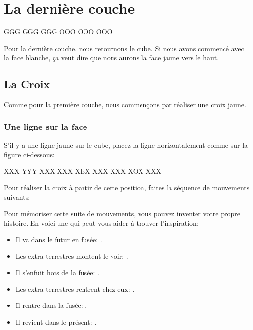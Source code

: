 \chapter{La dernière couche}


{
	\centering
	\RubikFaceRight%
	{G}{G}{G}%
	{G}{G}{G}%
	{G}{G}{G}
	\RubikFaceFront%
	{O}{O}{O}%
	{O}{O}{O}%
	{O}{O}{O}
	\par
}

Pour la dernière couche, nous retournons le cube. Si nous avons commencé avec la face blanche, ça veut dire que nous aurons la face jaune vers le haut. 

\section{La Croix}

Comme pour la première couche, nous commençons par réaliser une croix jaune.

\subsection{Une ligne sur la face}

\begin{samepage}
S’il y a une ligne jaune sur le cube, placez la ligne horizontalement comme sur la figure ci-dessous:

\begin{center}	
	\RubikFaceUp%
	{X}{X}{X}%
	{Y}{Y}{Y}%
	{X}{X}{X}
	\RubikFaceRight%
	{X}{X}{X}%
	{X}{B}{X}%
	{X}{X}{X}
	\RubikFaceFront%
	{X}{X}{X}%
	{X}{O}{X}%
	{X}{X}{X}
\end{center}
\end{samepage}
	
Pour réaliser la croix à partir de cette position, faites la séquence de mouvements suivants:


Pour mémoriser cette suite de mouvements, vous pouvez inventer votre propre histoire. En voici une qui peut vous aider à trouver l'inspiration:

\begin{itemize}
	\item Il va dans le futur en fusée: .
	\item Les extra-terrestres montent le voir: .
	\item Il s'enfuit hors de la fusée: .
	\item Les extra-terrestres rentrent chez eux: .
	\item Il rentre dans la fusée: .
	\item Il revient dans le présent: .
\end{itemize}


